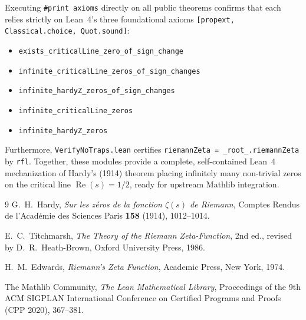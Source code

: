 \documentclass[11pt,a4paper]{article}
\theoremstyle{definition}
\begin{document}
Executing \texttt{\#print axioms} directly on all public theorems confirms that each relies strictly on Lean~4's three foundational axioms \texttt{[propext, Classical.choice, Quot.sound]}:
\begin{itemize}[noitemsep]
\item \texttt{exists\_\allowbreak criticalLine\_\allowbreak zero\_\allowbreak of\_\allowbreak sign\_\allowbreak change}
\item \texttt{infinite\_\allowbreak criticalLine\_\allowbreak zeros\_\allowbreak of\_\allowbreak sign\_\allowbreak changes}
\item \texttt{infinite\_\allowbreak hardyZ\_\allowbreak zeros\_\allowbreak of\_\allowbreak sign\_\allowbreak changes}
\item \texttt{infinite\_\allowbreak criticalLine\_\allowbreak zeros}
\item \texttt{infinite\_\allowbreak hardyZ\_\allowbreak zeros}
\end{itemize}
Furthermore, \texttt{VerifyNoTraps.lean} certifies \texttt{riemannZeta = \_root\_.riemannZeta} by \texttt{rfl}. Together, these modules provide a complete, self-contained Lean~4 mechanization of Hardy's (1914) theorem placing infinitely many non-trivial zeros on the critical line $\operatorname{Re}(s)=1/2$, ready for upstream Mathlib integration.

\begin{thebibliography}{9}
G.~H.~Hardy,
\emph{Sur les z\'eros de la fonction $\zeta(s)$ de Riemann},
Comptes Rendus de l'Acad\'emie des Sciences Paris \textbf{158} (1914), 1012--1014.

E.~C.~Titchmarsh,
\emph{The Theory of the Riemann Zeta-Function},
2nd ed., revised by D.~R.~Heath-Brown, Oxford University Press, 1986.

H.~M.~Edwards,
\emph{Riemann's Zeta Function},
Academic Press, New York, 1974.

The Mathlib Community,
\emph{The Lean Mathematical Library},
Proceedings of the 9th ACM SIGPLAN International Conference on Certified Programs and Proofs (CPP 2020), 367--381.
\end{thebibliography}
\end{document}
